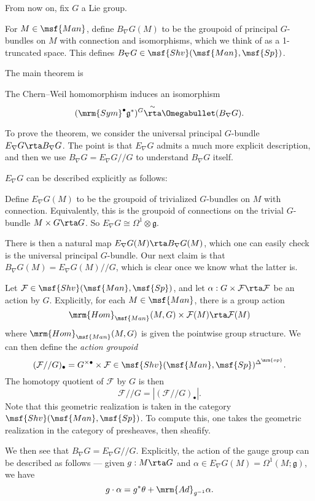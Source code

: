From now on, fix $G$ a Lie group.
\begin{ex}
   For $M \in \msf{Man}$, define $B_\nabla G(M)$ to be the groupoid of principal $G$-bundles on $M$ with connection and isomorphisms, which we think of as a 1-truncated space. This defines $B_\nabla G \in \msf{Shv}(\msf{Man}, \msf{Sp})$.
\end{ex}
The main theorem is
\begin{thm}
  The Chern--Weil homomorphism induces an isomorphism
  \[
    (\mrm{Sym}^\bullet \mathfrak{g}^*)^G \overset{\sim}{\rta} \Omegabullet (B_\nabla G).
  \]
\end{thm}

To prove the theorem, we consider the universal principal $G$-bundle $E_\nabla G \rta B_\nabla G$. The point is that $E_\nabla G$ admits a much more explicit description, and then we use $B_\nabla G = E_\nabla G // G$ to understand $B_\nabla G$ itself.

$E_\nabla G$ can be described explicitly as follows:

\begin{ex}
  Define $E_\nabla G (M)$ to be the groupoid of trivialized $G$-bundles on $M$ with connection. Equivalently, this is the groupoid of connections on the trivial $G$-bundle $M \times G \rta G$. So $E_\nabla G \cong \Omega^1 \otimes \mathfrak{g}$.
\end{ex}

There is then a natural map $E_\nabla G(M) \rta B_\nabla G(M)$, which one can easily check is the universal principal $G$-bundle. Our next claim is that $B_\nabla G(M) = E_\nabla G(M) // G$, which is clear once we know what the latter is.

\begin{defn}
  Let $\mathcal{F} \in \msf{Shv}(\msf{Man}, \msf{Sp})$, and let $\alpha : G \times \mathcal{F} \rta \mathcal{F}$ be an action by $G$. Explicitly, for each $M \in \msf{Man}$, there is a group action
  \[
    \mrm{Hom}_{\msf{Man}}(M, G) \times \mathcal{F}(M) \rta \mathcal{F}(M)
  \]
  where $\mrm{Hom}_{\msf{Man}}(M, G)$ is given the pointwise group structure. We can then define the \emph{action groupoid}
  \[
    (\mathcal{F}// G)_\bullet = G^{\times \bullet} \times \mathcal{F} \in \msf{Shv}(\msf{Man}, \msf{Sp})^{\Delta^\mrm{op}}.
  \]
  The homotopy quotient of $\mathcal{F}$ by $G$ is then
  \[
    \mathcal{F}// G = |(\mathcal{F}// G)_\bullet|.
  \]
  Note that this geometric realization is taken in the category $\msf{Shv}(\msf{Man}, \msf{Sp})$. To compute this, one takes the geometric realization in the category of presheaves, then sheafify.
\end{defn}
We then see that $B_\nabla G = E_\nabla G // G$. Explicitly, the action of the gauge group can be described as follows --- given $g: M \rta G$ and $\alpha \in E_\nabla G(M) = \Omega^1(M; \mathfrak{g})$, we have
\[
  g \cdot \alpha = g^* \theta + \mrm{Ad}_{g^{-1}} \alpha.
\]

